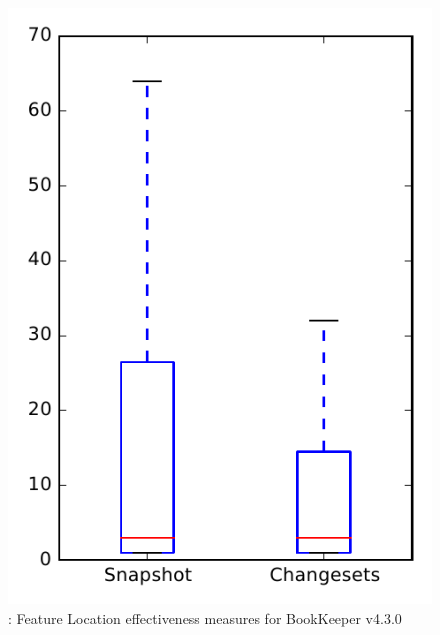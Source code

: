 
\begin{figure}
\centering
\includegraphics[height=0.4\textheight]{figures/flt/rq1_bookkeeper_no_outlier}
\caption{\fone: Feature Location effectiveness measures for BookKeeper v4.3.0}
\label{fig:flt:rq1:bookkeeper}
\end{figure}
